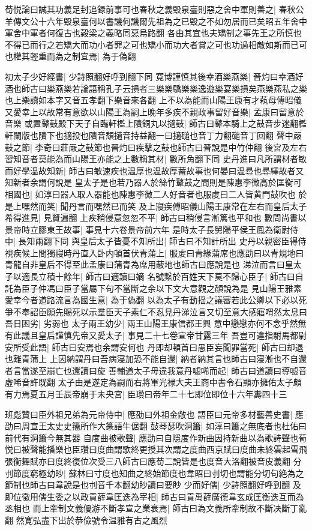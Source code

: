 荀悦論曰誠其功義足封追録前事可也春秋之義毁泉臺則惡之舍中軍則善之|{
	春秋公羊傳文公十六年毁泉臺何以書譏何譏爾先祖為之已毁之不如勿居而已矣昭五年舍中軍舍中軍者何復古也穀梁之義略同惡烏路翻}
各由其宜也夫矯制之事先王之所慎也不得已而行之若矯大而功小者罪之可也矯小而功大者賞之可也功過相敵如斯而已可也權其輕重而為之制宜焉|{
	為于偽翻}


初太子少好經書|{
	少詩照翻好呼到翻下同}
寛博謹慎其後幸酒樂燕樂|{
	晉灼曰幸酒好酒也師古曰樂燕樂若論語稱孔子云損者三樂樂驕樂樂逸遊樂宴樂損矣燕樂燕私之樂也上樂讀如本字又音五孝翻下樂音來各翻}
上不以為能而山陽王康有才萟母傅昭儀又愛幸上以故常有意欲以山陽王為嗣上晚年多疾不親政事留好音樂|{
	孟康曰留意於音樂}
或置鼙鼓殿下天子自臨軒檻上隤銅丸以擿鼓|{
	師古曰鼙本騎上之鼓音步迷翻檻軒闌版也隤下也擿投也隤音頹擿音持益翻一曰擿磓也音丁力翻磓音丁回翻}
聲中嚴鼓之節|{
	李奇曰莊嚴之鼔節也晉灼曰疾擊之鼔也師古曰晉說是中竹仲翻}
後宮及左右習知音者莫能為而山陽王亦能之上數稱其材|{
	數所角翻下同}
史丹進曰凡所謂材者敏而好學温故知新|{
	師古曰敏速疾也温厚也温故厚蓄故事也何晏曰温尋也尋繹故者又知新者余謂何說是}
皇太子是也若乃器人於絲竹鼙鼓之間則是陳惠李微高於匡衡可相國也|{
	如淳曰器人取人器能也陳惠李微二人好音者也服䖍曰二人皆黄門鼔吹也}
於是上嘿然而笑|{
	聞丹言而嘿然已而笑}
及上寢疾傅昭儀山陽王康常在左右而皇后太子希得進見|{
	見賢遍翻}
上疾稍侵意忽忽不平|{
	師古曰稍侵言漸篤也平和也}
數問尚書以景帝時立膠東王故事|{
	事見十六卷景帝前六年}
是時太子長舅陽平侯王鳳為衛尉侍中|{
	長知兩翻下同}
與皇后太子皆憂不知所出|{
	師古曰不知計所出}
史丹以親密臣得侍視疾候上間獨寢時丹直入卧内頓首伏青蒲上|{
	服䖍曰青緣蒲席也應劭曰以青規地曰青龍自非皇后不得至此孟康曰蒲青為席用蔽地也師古曰應說是也}
涕泣而言曰皇太子以適長立積十餘年|{
	師古曰適讀曰嫡}
名號繫於百姓天下莫不歸心臣子|{
	師古曰自託為臣子仲馮曰臣子當屬下句不當斷之余以下文大意觀之顔說為是}
見山陽王雅素愛幸今者道路流言為國生意|{
	為于偽翻}
以為太子有動揺之議審若此公卿以下必以死爭不奉詔臣願先賜死以示羣臣天子素仁不忍見丹涕泣言又切至意大感寤喟然太息曰吾日困劣|{
	劣弱也}
太子兩王幼少|{
	兩王山陽王康信都王興}
意中戀戀亦何不念乎然無有此議且皇后謹慎先帝又愛太子|{
	事見二十七卷宣帝甘露三年}
吾豈可違指駙馬都尉安所受此語|{
	師古曰安焉也余謂安何也}
丹即却頓首曰愚臣妄聞罪當死|{
	師古曰却退也離青蒲上}
上因納謂丹曰吾病寖加恐不能自還|{
	納者納其言也師古曰寖漸也不自還者言當遂至崩亡也還讀曰旋}
善輔道太子毋違我意丹嘘唏而起|{
	師古曰道讀曰導嘘音虛唏音許既翻}
太子由是遂定為嗣而右將軍光禄大夫王商中書令石顯亦擁佑太子頗有力焉夏五月壬辰帝崩于未央宮|{
	臣瓚曰帝年二十七即位即位十六年夀四十三}


班彪贊曰臣外祖兄弟為元帝侍中|{
	應劭曰外祖金敞也}
語臣曰元帝多材藝善史書|{
	應劭曰周宣王太史史籒所作大篆語牛倨翻}
鼔琴瑟吹洞簫|{
	如淳曰簫之無底者也杜佑曰前代有洞簫今無其器}
自度曲被歌聲|{
	應劭曰自隱度作新曲因持新曲以為歌詩聲也荀悦曰被聲能播樂也臣瓚曰度曲謂歌終更授其次謂之度曲西京賦曰度曲未終雲起雪飛張衡舞賦亦曰度終復位次受三八師古曰應荀二說皆是也度音大洛翻被音皮義翻}
分刌節度窮極幼眇|{
	蘇林曰寸度也知曲之終始節度也韋昭曰刌切也謂能分切句絶為之節制也師古曰韋說是也刌音千本翻幼眇讀曰要眇}
少而好儒|{
	少詩照翻好呼到翻}
及即位徵用儒生委之以政貢薛韋匡迭為宰相|{
	師古曰貢禹薛廣德韋玄成匡衡迭互而為丞相也}
而上牽制文義優游不斷孝宣之業衰焉|{
	師古曰為文義所牽制故不斷决斷丁亂翻}
然寛弘盡下出於恭儉號令温雅有古之風烈

